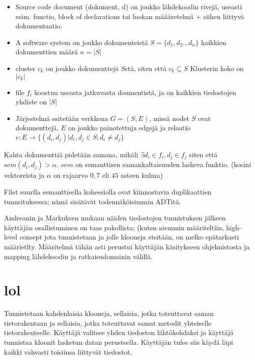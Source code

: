 \documentclass[finnish]{../tktltiki2}
\theoremstyle{definition}
\theoremstyle{remark}
\begin{document}
\begin{itemize}
  \item Source code document (dokument, d)
    on joukko lähdekoodin rivejä, useasti esim. functio, block of declarations tai luokan määäretelmä + siihen liittyvä
    dokumentaatio.

  \item A software system
    on joukko dokumenteistä $S = \{d_1,d_2\dots d_n\}$ %
    kaikkien dokumenttien määrä $n = |S|$

  \item cluster $c_k$
  on joukko dokumenttejä $S$stä, siten että $c_k \subseteq S$ Klusterin koko on $|c_k|$

  \item file $f_i$
    koostuu useasta jatkuvasta doumentistä, ja on kaikkien tiedostojen yhdiste on $|S|$

  \item Järjestelmä esitetään verkkona
    $G=(S,E)$, missä nodet $S$ ovat dokumenttejä, $E$ on joukko painotettuja edgejä ja relaatio
    $e: E \to \{(d_i,d_j) | d_i, d_j \in S; d_i \neq d_j  \}$

\end{itemize}
Kahta dokumenttiä pidetään samana, mikäli $\exists d_i \in f_i, d_j \in f_j $ siten että $sem(d_i, d_j) > \alpha$.
$sem$ on semanttisen samankaltaisuuden laskeva funktio. (kosini vektoreista ja $\alpha$ on rajaarvo $0,7$ eli $45$
asteen kulma)

Filet suurlla semanttisella koheesiolla ovat kiinnostavia duplikaattien tunnsituksessa; nämä sisätävät todennäköisimmin
ADTitä.

Andreanin ja Markuksen mukaan näiden tiedostojen tunnistuksen jälkeen käyttäjän osallistuminen on taas pakollista;
(kuten aiemmin määriteltiin, high-level consept jota tunnistetaan ja jolle klooneja etsitään, on melko epätarkasti
määrietlty. Määritelmä tähän asti perustui käyttäjän käsitykseen ohjelmistosta ja mapping lähdekoodin ja
ratkaisudomainin välillä.

\section{lol}

Tunnistetaan kahdenlaisia klooneja, sellaisia, jotka toteuttavat saman tietorakentaan ja sellaisia, jotka toteuttavat
samat metodit yhteiselle tietorakenteelle. Käyttäjä valitsee yhden tiedoston lähtökohdaksi ja käyttäjä tunnistaa kloonit
lasketun datan perusteella. Käyttäjän tulee siis käydä läpi kaikki vahvasti toisiinsa liittyvät tiedostot.
\end{document}
